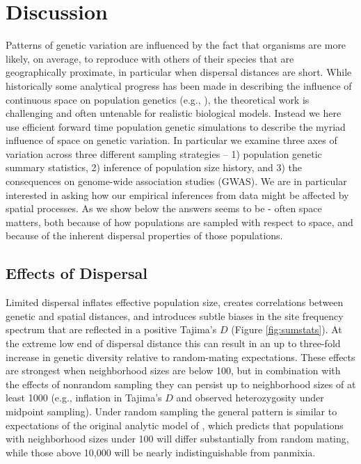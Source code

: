 \documentclass[11pt,twoside,lineno]{preprint}
\begin{document}
\section{Discussion}
Patterns of genetic variation are influenced by the fact that organisms are more likely, on average, to reproduce with others of their species that are geographically proximate, in particular when dispersal distances are short. While historically some analytical progress has been made in describing the influence of continuous space on population genetics (e.g., \cite{Wright1943,Rousset1997,Ringbauer2017,Barton2010}), the theoretical work is challenging and often untenable for realistic biological models. Instead we here use efficient forward time population genetic simulations to describe the myriad influence of space on genetic variation. In particular we examine three axes of variation across three different sampling strategies -- 1) population genetic summary statistics, 2) inference of population size history, and 3) the consequences on genome-wide association studies (GWAS). We are in particular interested in asking how our empirical inferences from data might be affected by spatial processes. As we show below the answers seems to be - often space matters, both because of how populations are sampled with respect to space, and because of the inherent dispersal properties of those populations. 

\subsection{Effects of Dispersal}
Limited dispersal inflates effective population size, creates correlations between genetic and spatial distances, and introduces subtle biases in the site frequency spectrum that are reflected in a positive Tajima's $D$ (Figure \ref{fig:sumstats}). At the extreme low end of dispersal distance this can result in an up to three-fold increase in genetic diversity relative to random-mating expectations. These effects are strongest when neighborhood sizes are below 100, but in combination with the effects of nonrandom sampling they can persist up to neighborhood sizes of at least 1000 (e.g., inflation in Tajima's $D$ and observed heterozygosity under midpoint sampling). Under random sampling the general pattern is similar to expectations of the original analytic model of \cite{Wright1943}, which predicts that populations with neighborhood sizes under 100 will differ substantially from random mating, while those above 10,000 will be nearly indistinguishable from panmixia. 
\end{document}
